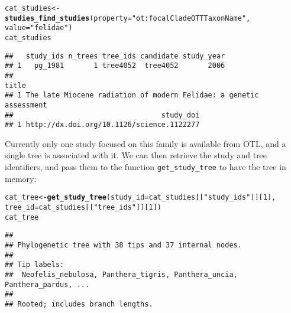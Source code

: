 \documentclass[12pt,letterpaper]{article}\usepackage[]{graphicx}\usepackage[]{color}
\makeatletter
\newcommand{\hlnum}[1]{\textcolor[rgb]{0.686,0.059,0.569}{#1}}%
\newcommand{\hlstr}[1]{\textcolor[rgb]{0.192,0.494,0.8}{#1}}%
\newcommand{\hlstd}[1]{\textcolor[rgb]{0.345,0.345,0.345}{#1}}%
\newcommand{\hlkwb}[1]{\textcolor[rgb]{0.69,0.353,0.396}{#1}}%
\newcommand{\hlkwc}[1]{\textcolor[rgb]{0.333,0.667,0.333}{#1}}%
\newcommand{\hlkwd}[1]{\textcolor[rgb]{0.737,0.353,0.396}{\textbf{#1}}}%
\newenvironment{kframe}{%
 \def\at@end@of@kframe{}%
 \ifinner\ifhmode%
  \def\at@end@of@kframe{\end{minipage}}%
  \begin{minipage}{\columnwidth}%
 \fi\fi%
 \def\FrameCommand##1{\hskip\@totalleftmargin \hskip-\fboxsep
 \colorbox{shadecolor}{##1}\hskip-\fboxsep
     \hskip-\linewidth \hskip-\@totalleftmargin \hskip\columnwidth}%
 \MakeFramed {\advance\hsize-\width
   \@totalleftmargin\z@ \linewidth\hsize
   \@setminipage}}%
 {\par\unskip\endMakeFramed%
 \at@end@of@kframe}
\newenvironment{knitrout}{}{} %
\makeatother
\begin{document}
\begin{knitrout}
\color{fgcolor}\begin{kframe}
\begin{alltt}
\hlstd{cat_studies} \hlkwb{<-} \hlkwd{studies_find_studies}\hlstd{(}\hlkwc{property} \hlstd{=} \hlstr{"ot:focalCladeOTTTaxonName"}\hlstd{,}
                                    \hlkwc{value} \hlstd{=} \hlstr{"felidae"}\hlstd{)}
\hlstd{cat_studies}
\end{alltt}
\begin{verbatim}
##   study_ids n_trees tree_ids candidate study_year
## 1   pg_1981       1 tree4052  tree4052       2006
##                                                                title
## 1 The late Miocene radiation of modern Felidae: a genetic assessment
##                                   study_doi
## 1 http://dx.doi.org/10.1126/science.1122277
\end{verbatim}
\end{kframe}
\end{knitrout}

Currently only one study focused on this family is available from OTL, and a
single tree is associated with it. We can then retrieve the study and tree
identifiers, and pass them to the function \texttt{get\_study\_tree} to have the
tree in memory:

\begin{knitrout}
\color{fgcolor}\begin{kframe}
\begin{alltt}
\hlstd{cat_tree} \hlkwb{<-} \hlkwd{get_study_tree}\hlstd{(}\hlkwc{study_id} \hlstd{= cat_studies[[}\hlstr{"study_ids"}\hlstd{]][}\hlnum{1}\hlstd{],}
                           \hlkwc{tree_id} \hlstd{= cat_studies[[}\hlstr{"tree_ids"}\hlstd{]][}\hlnum{1}\hlstd{])}
\hlstd{cat_tree}
\end{alltt}
\end{kframe}
\end{knitrout}

\begin{knitrout}
\color{fgcolor}\begin{kframe}
\begin{verbatim}
## 
## Phylogenetic tree with 38 tips and 37 internal nodes.
## 
## Tip labels:
## 	Neofelis_nebulosa, Panthera_tigris, Panthera_uncia, Panthera_pardus, ...
## 
## Rooted; includes branch lengths.
\end{verbatim}
\end{kframe}
\end{knitrout}
\end{document}
